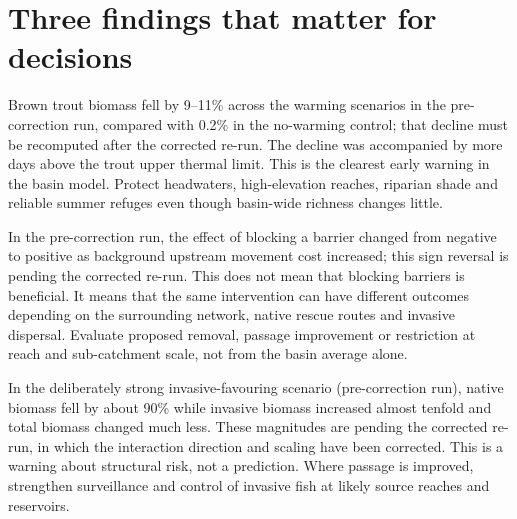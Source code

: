 \documentclass[10pt,a4paper]{article}
\begin{document}
\clearpage
\section*{Three findings that matter for decisions}

\begin{tcolorbox}[colback=actiongreen,colframe=green!45!black,title=\textbf{1. Protect cold-water refuges now},fonttitle=\bfseries]
Brown trout biomass fell by 9--11\% across the warming scenarios in the pre-correction run, compared with 0.2\% in the no-warming control; that decline must be recomputed after the corrected re-run. The decline was accompanied by more days above the trout upper thermal limit. This is the clearest early warning in the basin model. Protect headwaters, high-elevation reaches, riparian shade and reliable summer refuges even though basin-wide richness changes little.
\end{tcolorbox}

\begin{tcolorbox}[colback=warningorange,colframe=orange!60!black,title=\textbf{2. Assess every barrier in its network context},fonttitle=\bfseries]
In the pre-correction run, the effect of blocking a barrier changed from negative to positive as background upstream movement cost increased; this sign reversal is pending the corrected re-run. This does not mean that blocking barriers is beneficial. It means that the same intervention can have different outcomes depending on the surrounding network, native rescue routes and invasive dispersal. Evaluate proposed removal, passage improvement or restriction at reach and sub-catchment scale, not from the basin average alone.
\end{tcolorbox}

\begin{tcolorbox}[colback=riskred,colframe=red!55!black,title=\textbf{3. Pair connectivity work with invasive control},fonttitle=\bfseries]
In the deliberately strong invasive-favouring scenario (pre-correction run), native biomass fell by about 90\% while invasive biomass increased almost tenfold and total biomass changed much less. These magnitudes are pending the corrected re-run, in which the interaction direction and scaling have been corrected. This is a warning about structural risk, not a prediction. Where passage is improved, strengthen surveillance and control of invasive fish at likely source reaches and reservoirs.
\end{tcolorbox}
\end{document}
